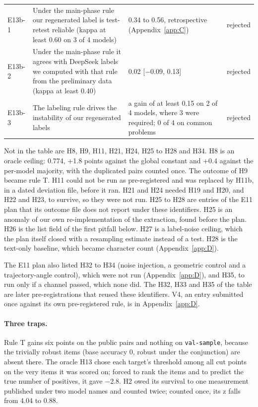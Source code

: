 {\begin{longtable}{L{1.1cm}L{3.9cm}L{5.6cm}L{2.0cm}}
E13b-1 & Under the main-phase rule our regenerated label is test-retest reliable (kappa at least 0.60 on 3 of 4 models) & 0.34 to 0.56, retrospective (Appendix~\ref{app:C}) & rejected \\
E13b-2 & Under the main-phase rule it agrees with DeepSeek labels we computed with that rule from the preliminary data (kappa at least 0.40) & 0.02 [$-$0.09, 0.13] & rejected \\
E13b-3 & The labeling rule drives the instability of our regenerated labels & a gain of at least 0.15 on 2 of 4 models, where 3 were required; 0 of 4 on common problems & rejected \\
\end{longtable}
}

Not in the table are H8, H9, H11, H21, H24, H25 to H28 and H34. H8 is an oracle ceiling: 0.774, +1.8 points against the global constant and +0.4 against the per-model majority, with the duplicated pairs counted once. The outcome of H9 became rule T. H11 could not be run as pre-registered and was replaced by H11b, in a dated deviation file, before it ran. H21 and H24 needed H19 and H20, and H22 and H23, to survive, so they were not run. H25 to H28 are entries of the E11 plan that its outcome file does not report under these identifiers. H25 is an anomaly of our own re-implementation of the extraction, found before the plan. H26 is the list field of the first pitfall below. H27 is a label-noise ceiling, which the plan itself closed with a resampling estimate instead of a test. H28 is the text-only baseline, which became character count (Appendix~\ref{app:D}).

The E11 plan also listed H32 to H34 (noise injection, a geometric control and a trajectory-angle control), which were not run (Appendix~\ref{app:D}), and H35, to run only if a channel passed, which none did. The H32, H33 and H35 of the table are later pre-registrations that reused these identifiers. V4, an entry submitted once against its own pre-registered rule, is in Appendix~\ref{app:D}.

\paragraph{Three traps.} Rule T gains six points on the public pairs and nothing on \texttt{val-sample}, because the trivially robust items (base accuracy 0, robust under the conjunction) are absent there. The oracle H13 chose each target's threshold among all cut points on the very items it was scored on; forced to rank the items and to predict the true number of positives, it gave $-$2.8. H2 owed its survival to one measurement published under two model names and counted twice; counted once, its z falls from 4.04 to 0.88.


